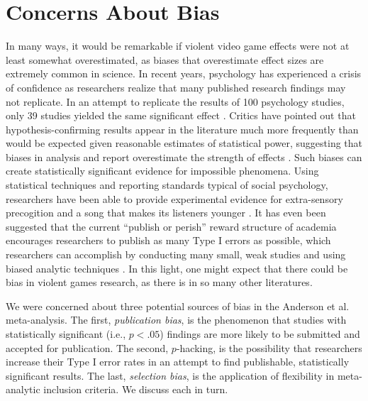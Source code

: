 \documentclass[man]{apa6}
\begin{document}
\section{Concerns About Bias}
In many ways, it would be remarkable if violent video game effects were not at least somewhat overestimated, as biases that overestimate effect sizes are extremely common in science.
In recent years, psychology has experienced a crisis of confidence as researchers realize that many published research findings may not replicate. In an attempt to replicate the results of 100 psychology studies, only 39 studies yielded the same significant effect \citep{OpenScienceCollaboration:2015}. Critics have pointed out that hypothesis-confirming results appear in the literature much more frequently than would be expected given reasonable estimates of statistical power, suggesting that biases in analysis and report overestimate the strength of effects \citep[see][]{Schimmack:2012}. Such biases can create statistically significant evidence for impossible phenomena. Using statistical techniques and reporting standards typical of social psychology, researchers have been able to provide experimental evidence for extra-sensory precogition \citep{Bem:2011} and a song that makes its listeners younger \citep{Simmons:etal:2011}. 
It has even been suggested that the current ``publish or perish'' reward structure of academia encourages researchers to publish as many Type I errors as possible, which researchers can accomplish by conducting many small, weak studies and using biased analytic techniques \citep{Bakker:etal:2012}. In this light, one might expect that there could be bias in violent games research, as there is in so many other literatures. 

We were concerned about three potential sources of bias in the Anderson et al. meta-analysis. The first, {\em publication bias}, is the phenomenon that studies with statistically significant (i.e., $p<.05$) findings are more likely to be submitted and accepted for publication. The second, $p$-hacking, is the possibility that researchers increase their Type I error rates in an attempt to find publishable, statistically significant results. The last, {\em selection bias}, is the application of flexibility in meta-analytic inclusion criteria. We discuss each in turn.
\end{document}
